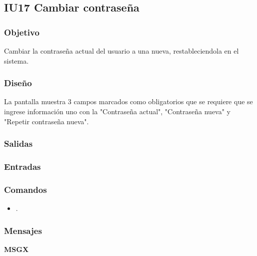 \newpage
\subsection{IU17 Cambiar contraseña}

\subsubsection{Objetivo}
	Cambiar la contraseña actual del usuario a una nueva, restableciendola en el sistema.
	
\subsubsection{Diseño}
	La pantalla muestra 3 campos marcados como obligatorios que se requiere que se ingrese información uno con la "Contraseña actual", "Contraseña nueva" y "Repetir contraseña nueva".	


\subsubsection{Salidas}

\subsubsection{Entradas}

\subsubsection{Comandos}
\begin{itemize}
	\item {}.
\end{itemize}

\subsubsection{Mensajes}
\begin{Citemize}
	\item {\bf MSGX} 
\end{Citemize}